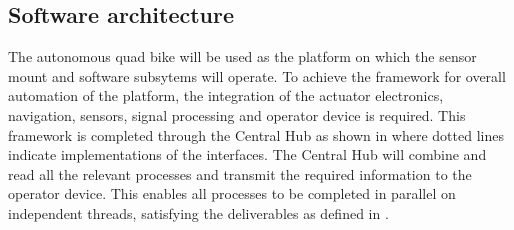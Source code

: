 \documentclass[main.tex]{subfiles}
\begin{document}


\subsection{Software architecture}
The autonomous quad bike will be used as the platform on which the sensor mount and software subsytems will operate. To achieve the framework for overall automation of the platform, the integration of the actuator electronics, navigation, sensors, signal processing and operator device is required. This framework is completed through the Central Hub as shown in  where dotted lines indicate implementations of the interfaces. The Central Hub will combine and read all the relevant processes and transmit the required information to the operator device. This enables all processes to be completed in parallel on independent threads, satisfying the deliverables as defined in .
\end{document}
